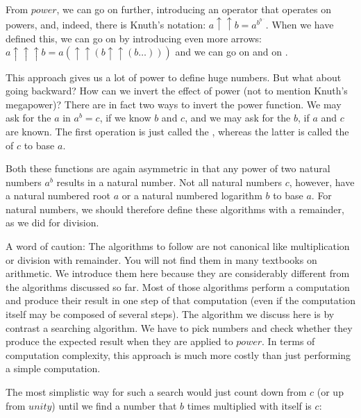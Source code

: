 \documentclass{scrreprt}
\newcommand{\Varid}[1]{\mathit{#1}}
\begin{document}
From \ensuremath{\Varid{power}}, we can go on further,
introducing an operator that operates on powers,
and, indeed, there is Knuth's  notation:
$a \uparrow\uparrow b = a^{b^{b^{\dots}}}$.
When we have defined this, 
we can go on by introducing even more arrows:
$a \uparrow\uparrow\uparrow b = a(\uparrow\uparrow (b \uparrow\uparrow (b \dots)))$
and we can go on and on .

This approach gives us a lot of power
to define huge numbers.
But what about going backward?
How can we invert the effect of power 
(not to mention Knuth's megapower)?
There are in fact two ways to invert
the power function.
We may ask for the  $a$ in $a^b = c$,
if we know $b$ and $c$,
and we may ask for the  $b$,
if $a$ and $c$ are known.
The first operation is just called the ,
whereas the latter is called the 
of $c$ to base $a$.

Both these functions are again asymmetric
in that any power of two natural numbers $a^b$
results in a natural number.
Not all natural numbers $c$, however,
have a natural numbered root $a$
or a natural numbered logarithm $b$ to base $a$.
For natural numbers, we should therefore
define these algorithms with a remainder,
as we did for division.

A word of caution:
The algorithms to follow are not canonical 
like multiplication or division with remainder.
You will not find them in many textbooks
on arithmetic.
We introduce them here
because they are considerably different
from the algorithms discussed so far.
Most of those algorithms perform
a computation and produce their result
in one step of that computation
(even if the computation itself may be composed
of several steps).
The algorithm we discuss here
is by contrast a searching algorithm.
We have to pick numbers and check
whether they produce the expected result
when they are applied to \ensuremath{\Varid{power}}. 
In terms of computation complexity,
this approach
is much more costly 
than just performing a simple computation.

The most simplistic way for such a search
would just count down from $c$ (or up from \ensuremath{\Varid{unity}}) until
we find a number that $b$ times multiplied
with itself is $c$: 
\end{document}
